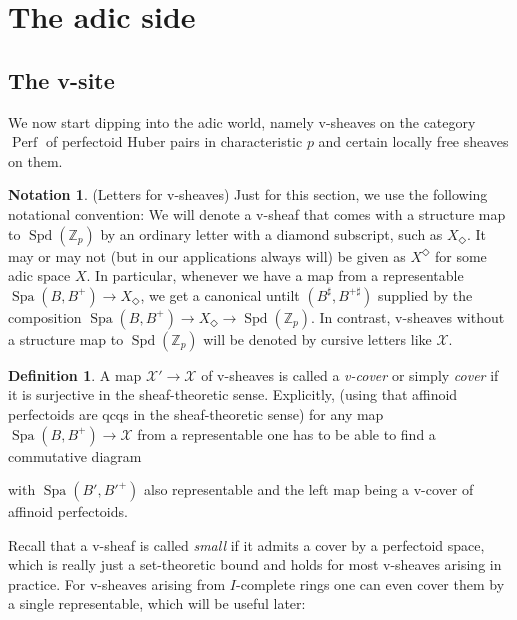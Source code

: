\documentclass[10pt,twoside]{article}
\numberwithin{equation}{section}
\theoremstyle{plain}
\theoremstyle{definition}
\newtheorem{mydef}[mythm]{Definition}
\newtheorem{mynot}[mythm]{Notation}
\DeclareMathOperator{\Spa}{Spa}
\DeclareMathOperator{\Spd}{Spd}
\DeclareMathOperator{\Perf}{Perf}
\newcommand{\ZZ}{\mathbb{Z}}
\newcommand{\MCX}{\mathcal{X}}
\let \diamond \Diamond
\begin{document}
\section{The adic side}
\subsection{The v-site}
We now start dipping into the adic world, namely v-sheaves on the category \(\Perf\) of perfectoid Huber pairs in characteristic \(p\) and certain locally free sheaves on them.\par

\begin{mynot}\label{notationVSheaves}(Letters for v-sheaves)
Just for this section, we use the following notational convention: We will denote a v-sheaf that comes with a structure map to \(\Spd(\ZZ_p)\) by an ordinary letter with a diamond subscript, such as \(X_{\diamond}\). It may or may not (but in our applications always will) be given as \(X^\diamond\) for some adic space \(X\). In particular, whenever we have a map from a representable \(\Spa(B,B^+)\to X_{\diamond}\), we get a canonical untilt \((B^{\sharp},B^{+\sharp})\) supplied by the composition \(\Spa(B,B^+)\to X_{\diamond}\to \Spd(\ZZ_p)\). In contrast, v-sheaves without a structure map to \(\Spd(\ZZ_p)\) will be denoted by cursive letters like \(\MCX\).
\end{mynot}


\begin{mydef}
    A map \(\MCX'\to \MCX\) of v-sheaves is called a \emph{v-cover} or simply \emph{cover} if it is surjective in the sheaf-theoretic sense. Explicitly, (using that affinoid perfectoids are qcqs in the sheaf-theoretic sense) for any map \(\Spa(B,B^+)\to \MCX\) from a representable one has to be able to find a commutative diagram
    \begin{center}
    \end{center}
    with \(\Spa(B',B'^+)\) also representable and the left map being a v-cover of affinoid perfectoids.
\end{mydef}


Recall that a v-sheaf is called \emph{small} if it admits a cover by a perfectoid space, which is really just a set-theoretic bound and holds for most v-sheaves arising in practice. For v-sheaves arising from \(I\)-complete rings one can even cover them by a single representable, which will be useful later:
\end{document}
